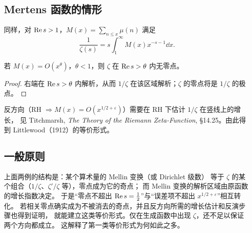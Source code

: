 \documentclass[11pt]{article}
\begin{document}
\subsection{Mertens 函数的情形}
同样，对 $\operatorname{Re} s>1$，$M(x)=\sum_{n\le x}\mu(n)$ 满足
\[
 \frac1{\zeta(s)}=s\int_1^\infty M(x)x^{-s-1}\dd x .                   \tag{3.2}
\]
\begin{proposition}\label{prop:mertens}
若 $M(x)=O(x^\theta)$，$\theta<1$，则 $\zeta$ 在 $\operatorname{Re} s>\theta$ 内无零点。
\end{proposition}
\begin{proof}
右端在 $\operatorname{Re} s>\theta$ 内解析，从而 $1/\zeta$ 在该区域解析；$\zeta$ 的零点将是 $1/\zeta$ 的极点。
\end{proof}
反方向（RH $\Rightarrow M(x)=O(x^{1/2+\varepsilon})$）需要在 RH 下估计 $1/\zeta$ 在竖线上的增长，
见 Titchmarsh, \emph{The Theory of the Riemann Zeta-Function}, \S14.25。由此得到 Littlewood（1912）的等价形式。

\subsection{一般原则}
上面两例的结构是：某个算术量的 Mellin 变换（或 Dirichlet 级数）
等于 $\zeta$ 的某个组合（$1/\zeta$、$\zeta'/\zeta$ 等），零点成为它的奇点；
而 Mellin 变换的解析区域由原函数的增长指数决定。
于是“零点不超出 $\operatorname{Re} s=\tfrac12$”与“误差项不超出 $x^{1/2+\varepsilon}$”相互转化。
若相关零点确实成为不被消去的奇点，并且反方向所需的增长估计和反演步骤也得到证明，
就能建立这类等价形式。仅在生成函数中出现 $\zeta$，还不足以保证两个方向都成立。
这解释了第一类等价形式为何如此之多。
\end{document}
